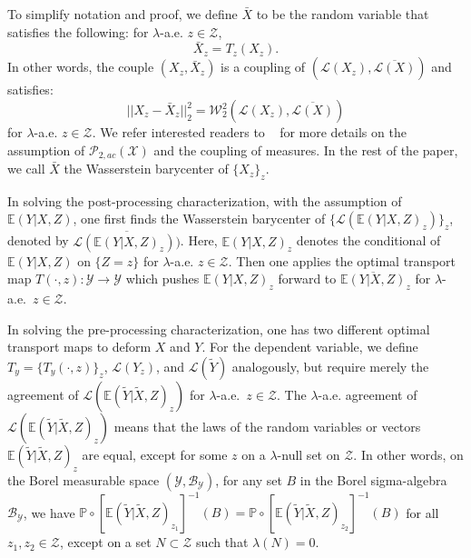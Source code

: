 \documentclass[twoside,11pt]{article}
\begin{document}
To simplify notation and proof, we define $\bar{X}$ to be the random variable that satisfies the following: for $\lambda$-a.e. $z \in \mathcal{Z}$,
\begin{equation}
\bar{X}_z = T_z(X_z).
\end{equation}
In other words, the couple $(X_z,\bar{X}_z)$ is a coupling of $(\mathcal{L}(X_z), \overline{\mathcal{L}(X)})$ and satisfies:
\begin{equation}
||X_z - \bar{X}_z||_2^2 = \mathcal{W}^2_2(\mathcal{L}(X_z), \overline{\mathcal{L}(X)})
\end{equation}
for $\lambda$-a.e. $z \in \mathcal{Z}$. We refer interested readers to ~\cite{villani2021topics, villani2009optimal} for more details on the assumption of $\mathcal{P}_{2,ac}(\mathcal{X})$ and the coupling of measures. In the rest of the paper, we call $\bar{X}$ the Wasserstein barycenter of $\{X_z\}_z$.

In solving the post-processing characterization, with the assumption of $\mathbb{E}(Y|X,Z)$, one first finds the Wasserstein barycenter of $\{\mathcal{L}(\mathbb{E}(Y|X,Z)_z)\}_z$, denoted by $\overline{\mathcal{L}(\mathbb{E}(Y|X,Z)_z))}$. Here, $\mathbb{E}(Y|X,Z)_z$ denotes the conditional of $\mathbb{E}(Y|X,Z)$ on $\{Z = z\}$ for $\lambda$-a.e. $z \in \mathcal{Z}$. Then one applies the optimal transport map $T(\cdot,z): \mathcal{Y} \rightarrow \mathcal{Y}$ which pushes $\mathbb{E}(Y|X,Z)_z$ forward to $\overline{\mathbb{E}(Y|X,Z)}_z$ for $\lambda$-a.e.\ $z \in \mathcal{Z}$.

In solving the pre-processing characterization, one has two different optimal transport maps to deform $X$ and $Y$. For the dependent variable, we define $T_y = \{T_y(\cdot,z)\}_z$, $\mathcal{L}(Y_z)$, and $\mathcal{L}(\tilde{Y})$ analogously, but require merely the agreement of $\mathcal{L}(\mathbb{E}(\tilde{Y}|\tilde{X},Z)_z)$ for $\lambda$-a.e.\  $z \in \mathcal{Z}$. The $\lambda$-a.e. agreement of $\mathcal{L}(\mathbb{E}(\tilde{Y}|\tilde{X},Z)_z)$ means that the laws of the random variables or vectors $\mathbb{E}(\tilde{Y}|\tilde{X},Z)_z$ are equal, except for some $z$ on a $\lambda$-null set on $\mathcal{Z}$. In other words, on the Borel measurable space $(\mathcal{Y},\mathcal{B}_{\mathcal{Y}})$, for any set $B$ in the Borel sigma-algebra $\mathcal{B}_{\mathcal{Y}}$, we have $\mathbb{P} \circ [\mathbb{E}(\tilde{Y}|\tilde{X},Z)_{z_1}]^{-1}(B) = \mathbb{P} \circ [\mathbb{E}(\tilde{Y}|\tilde{X},Z)_{z_2}]^{-1}(B)$ for all $z_1, z_2 \in \mathcal {Z}$, except on a set $N \subset \mathcal{Z}$ such that $\lambda(N) = 0$.
\end{document}
